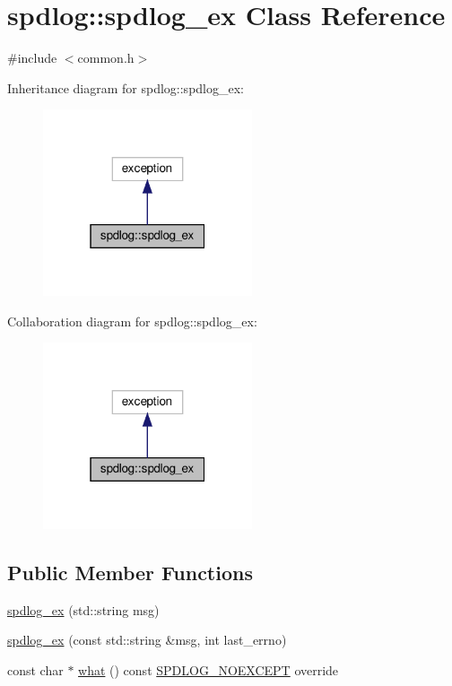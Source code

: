 \hypertarget{classspdlog_1_1spdlog__ex}{}\section{spdlog\+:\+:spdlog\+\_\+ex Class Reference}
\label{classspdlog_1_1spdlog__ex}


{\ttfamily \#include $<$common.\+h$>$}



Inheritance diagram for spdlog\+:\+:spdlog\+\_\+ex\+:
\nopagebreak
\begin{figure}[H]
\begin{center}
\leavevmode
\includegraphics[width=175pt]{classspdlog_1_1spdlog__ex__inherit__graph}
\end{center}
\end{figure}


Collaboration diagram for spdlog\+:\+:spdlog\+\_\+ex\+:
\nopagebreak
\begin{figure}[H]
\begin{center}
\leavevmode
\includegraphics[width=175pt]{classspdlog_1_1spdlog__ex__coll__graph}
\end{center}
\end{figure}
\subsection*{Public Member Functions}
\begin{DoxyCompactItemize}
\item 
\hyperlink{classspdlog_1_1spdlog__ex_a95052672da1a71145ac56d143b751b3f}{spdlog\+\_\+ex} (std\+::string msg)
\item 
\hyperlink{classspdlog_1_1spdlog__ex_a0758933dd1e6c4c8e76bb8e7134f7d9b}{spdlog\+\_\+ex} (const std\+::string \&msg, int last\+\_\+errno)
\item 
const char $\ast$ \hyperlink{classspdlog_1_1spdlog__ex_a9a9b9a7981e472cad06d453e368b6195}{what} () const \hyperlink{common_8h_a15d2dc432e6bb83beb5130be9a4ca8d6}{S\+P\+D\+L\+O\+G\+\_\+\+N\+O\+E\+X\+C\+E\+PT} override
\end{DoxyCompactItemize}


